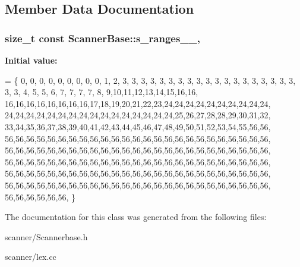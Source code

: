 \subsection{Member Data Documentation}
\hypertarget{classScannerBase_a900ba43aca6a632d3eb27a17b3f34834}{
\subsubsection[{s\+\_\+ranges\+\_\+\+\_\+}]{\setlength{\rightskip}{0pt plus 5cm}size\+\_\+t const Scanner\+Base\+::s\+\_\+ranges\+\_\+\+\_\+\hspace{0.3cm}{\ttfamily [static]}, {\ttfamily [protected]}}}\label{classScannerBase_a900ba43aca6a632d3eb27a17b3f34834}
{\bfseries Initial value\+:}
\begin{DoxyCode}
=
\{
     0, 0, 0, 0, 0, 0, 0, 0, 0, 1, 2, 3, 3, 3, 3, 3, 3, 3, 3, 3, 3, 3, 3, 3, 3,
     3, 3, 3, 3, 3, 3, 3, 4, 5, 5, 6, 7, 7, 7, 7, 8, 9,10,11,12,13,14,15,16,16,
    16,16,16,16,16,16,16,16,17,18,19,20,21,22,23,24,24,24,24,24,24,24,24,24,24,
    24,24,24,24,24,24,24,24,24,24,24,24,24,24,24,24,25,26,27,28,28,29,30,31,32,
    33,34,35,36,37,38,39,40,41,42,43,44,45,46,47,48,49,50,51,52,53,54,55,56,56,
    56,56,56,56,56,56,56,56,56,56,56,56,56,56,56,56,56,56,56,56,56,56,56,56,56,
    56,56,56,56,56,56,56,56,56,56,56,56,56,56,56,56,56,56,56,56,56,56,56,56,56,
    56,56,56,56,56,56,56,56,56,56,56,56,56,56,56,56,56,56,56,56,56,56,56,56,56,
    56,56,56,56,56,56,56,56,56,56,56,56,56,56,56,56,56,56,56,56,56,56,56,56,56,
    56,56,56,56,56,56,56,56,56,56,56,56,56,56,56,56,56,56,56,56,56,56,56,56,56,
    56,56,56,56,56,56,
\}
\end{DoxyCode}


The documentation for this class was generated from the following files\+:\begin{DoxyCompactItemize}
\item 
scanner/Scannerbase.\+h\item 
scanner/lex.\+cc\end{DoxyCompactItemize}
